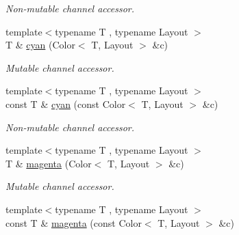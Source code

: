 \begin{DoxyCompactItemize}
\begin{DoxyCompactList}\small\item\em Non-\/mutable channel accessor. \end{DoxyCompactList}\item 
\hypertarget{group___channel_accessors_ga47dfa2b4967e6d59132775b062f770be}{{\footnotesize template$<$typename T , typename Layout $>$ }\\T \& \hyperlink{group___channel_accessors_ga47dfa2b4967e6d59132775b062f770be}{cyan} (Color$<$ T, Layout $>$ \&c)}\label{group___channel_accessors_ga47dfa2b4967e6d59132775b062f770be}

\begin{DoxyCompactList}\small\item\em Mutable channel accessor. \end{DoxyCompactList}\item 
\hypertarget{group___channel_accessors_gaae689fe2a49dafa645bed231415281be}{{\footnotesize template$<$typename T , typename Layout $>$ }\\const T \& \hyperlink{group___channel_accessors_gaae689fe2a49dafa645bed231415281be}{cyan} (const Color$<$ T, Layout $>$ \&c)}\label{group___channel_accessors_gaae689fe2a49dafa645bed231415281be}

\begin{DoxyCompactList}\small\item\em Non-\/mutable channel accessor. \end{DoxyCompactList}\item 
\hypertarget{group___channel_accessors_gad0c36c945f72154bacb9dd3339da3eb8}{{\footnotesize template$<$typename T , typename Layout $>$ }\\T \& \hyperlink{group___channel_accessors_gad0c36c945f72154bacb9dd3339da3eb8}{magenta} (Color$<$ T, Layout $>$ \&c)}\label{group___channel_accessors_gad0c36c945f72154bacb9dd3339da3eb8}

\begin{DoxyCompactList}\small\item\em Mutable channel accessor. \end{DoxyCompactList}\item 
\hypertarget{group___channel_accessors_ga012dc44d2b56f5688643a355f0737daa}{{\footnotesize template$<$typename T , typename Layout $>$ }\\const T \& \hyperlink{group___channel_accessors_ga012dc44d2b56f5688643a355f0737daa}{magenta} (const Color$<$ T, Layout $>$ \&c)}\label{group___channel_accessors_ga012dc44d2b56f5688643a355f0737daa}


\end{DoxyCompactItemize}
